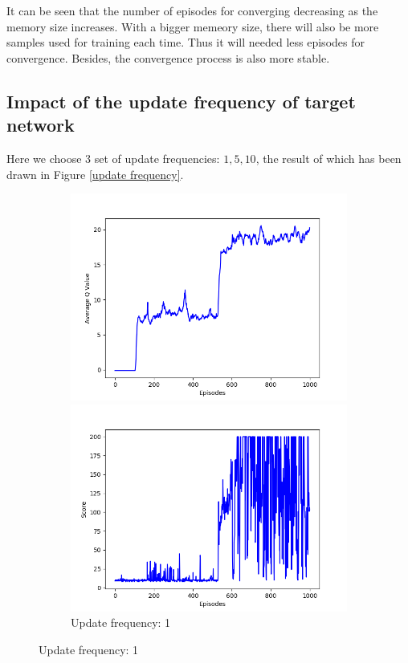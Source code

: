 \documentclass{article}
\begin{document}
It can be seen that the number of episodes for converging decreasing as the memory size increases.
With a bigger memeory size, there will also be more samples used for training each time. Thus it will needed less
episodes for convergence. Besides, the convergence process is also more stable.

\subsection{Impact of the update frequency of target network}

Here we choose 3 set of update frequencies: $1,5,10$, the result of which has been drawn in Figure
\ref{update frequency}.

\begin{figure}[!htbp]
  \centering
  \begin{subfigure}{\textwidth}
    \begin{minipage}{0.5\textwidth}
      \centering
      \includegraphics[scale=0.45]{../experiments/update_fq_1/qvalues.png}
    \end{minipage}
    \begin{minipage}{0.5\textwidth}
      \centering
      \includegraphics[scale=0.45]{../experiments/update_fq_1/scores.png}
    \end{minipage}
    \caption{Update frequency: 1}
  \end{subfigure}%


\end{figure}
\end{document}
